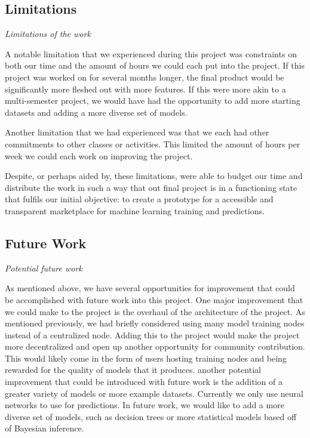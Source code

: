 \documentclass{article}
\begin{document}
    \subsection{Limitations}
    \emph{Limitations of the work}

    A notable limitation that we experienced during this project was constraints on both our time and the amount of
    hours we could each put into the project.  If this project was worked on for several months longer, the final product
    would be significantly more fleshed out with more features.  If this were more akin to a multi-semester project,
    we would have had the opportunity to add more starting datasets and adding a more diverse set of models.

    Another limitation that we had experienced was that we each had other commitments to other classes or activities.
    This limited the amount of hours per week we could each work on improving the project.

    Despite, or perhaps aided by, these limitations, were able to budget our time and distribute the work in such a way
    that out final project is in a functioning state that fulfils our initial objective: to create a prototype for a
    accessible and transparent marketplace for machine learning training and predictions.

    \subsection{Future Work}
    \emph{Potential future work}

    As mentioned above, we have several opportunities for improvement that could be accomplished with future work
    into this project.  One major improvement that we could make to the project is the overhaul of the architecture of
    the project.  As mentioned previously, we had briefly considered using many model training nodes instead of a
    centralized node.  Adding this to the project would make the project more decentralized and open up another opportunity
    for community contribution.  This would likely come in the form of users hosting training nodes and being rewarded for
    the quality of models that it produces.  another potential improvement that could be introduced with future work is
    the addition of a greater variety of models or more example datasets.  Currently we only use neural networks to
    use for predictions.  In future work, we would like to add a more diverse set of models, such as decision trees or
    more statistical models based off of Bayesian inference.

    \pagebreak
    
\end{document}
